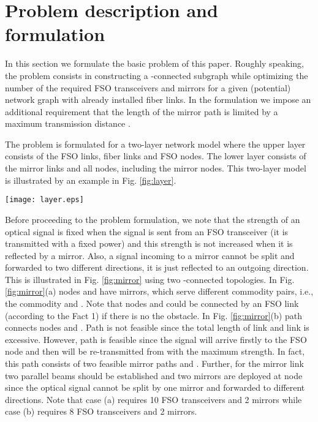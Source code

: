 \documentclass[onecolumn,11pt,draftclsnofoot]{IEEEtran}
\begin{document}
\section{Problem description and formulation}\label{sec:formulation}
In this section we formulate the basic problem of this paper. Roughly speaking, the problem consists in constructing a -connected subgraph while optimizing the number of the required FSO transceivers and mirrors for a given (potential) network graph with already installed fiber links. In the formulation we impose an additional requirement that the length of the mirror path is limited by a maximum transmission distance .

The problem is formulated for a two-layer network model where the upper layer consists of the FSO links, fiber links and FSO nodes. The lower layer consists of the mirror links and all nodes, including the mirror nodes. This two-layer model is illustrated by an example in Fig. \ref{fig:layer}.

\begin{figure*}[!htbp]
\centering
\texttt{[image: layer.eps]}
\caption{An illustration of two layers for a graph}
\label{fig:layer}
\end{figure*}

Before proceeding to the problem formulation, we note that the strength of an optical signal is fixed when the signal is sent from an FSO transceiver (it is transmitted with a fixed power) and this strength is not increased when it is reflected by a mirror. Also, a signal incoming to a mirror cannot be split and forwarded to two different directions, it is just reflected to an outgoing direction. This is illustrated in Fig. \ref{fig:mirror} using two -connected topologies. In Fig. \ref{fig:mirror}(a) nodes  and  have mirrors, which serve different commodity pairs, i.e., the commodity   and . Note that nodes  and  could be connected by an FSO link (according to the Fact 1) if there is no the obstacle.
In Fig. \ref{fig:mirror}(b) path  connects nodes  and . Path  is not feasible since the total length of link  and link  is excessive. However, path  is feasible since the signal will arrive firstly to the FSO node  and then will be re-transmitted from with the maximum strength. In fact, this path consists of two feasible mirror paths  and . Further, for the mirror link  two parallel beams should be established and two mirrors are deployed at node  since the optical signal cannot be split by one mirror and forwarded to different directions. Note that case (a) requires 10 FSO transceivers and 2 mirrors while case (b) requires 8 FSO transceivers and 2 mirrors.
\end{document}
